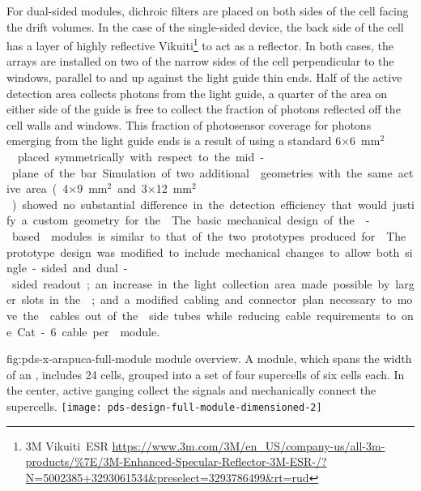 For dual-sided  modules, dichroic filters are placed on both sides of the cell facing the drift volumes.  In the case of the single-sided device, the back side of the cell has a layer of highly reflective Vikuiti\footnote{3M Vikuiti\texttrademark\  ESR \url{https://www.3m.com/3M/en_US/company-us/all-3m-products/\%7E/3M-Enhanced-Specular-Reflector-3M-ESR-/?N=5002385+3293061534&preselect=3293786499&rt=rud}
}
 to act as a  reflector.  In both cases, the  arrays are installed on two of the narrow sides of the cell perpendicular to the windows, parallel to and up against the light guide thin ends. Half of the  active detection area collects photons from the light guide, a quarter of the area on either side of the guide is free to collect the fraction of photons reflected off the cell walls and windows. 
This fraction of photosensor coverage for photons emerging from the light guide ends is a result of using a standard \num{6}$\times$\SI{6}{mm$^2$}  placed symmetrically with respect to the mid-plane of the bar. Simulation of two additional  geometries with the same active area (\num{4}$\times$\SI{9}{mm$^2$} and \num{3}$\times$\SI{12}{mm$^2$}) showed no substantial difference in the detection efficiency that would justify a custom geometry for the .

The basic mechanical design of the -based  modules is similar to that of the two prototypes produced for . 
The prototype design was modified to include mechanical changes to allow both single-sided and dual-sided readout; an increase in the light collection area made possible by larger slots in the ; and a modified cabling and connector plan necessary to move the  cables out of the  side tubes while reducing cable requirements to one Cat-6 cable per  module.

\begin{dunefigure}
{fig:pds-x-arapuca-full-module}
{ module overview. A module, which spans the width of an , includes 24
  cells, grouped into a set of four supercells of six cells each. In the center, active ganging  collect the signals and mechanically connect the supercells.}
   \texttt{[image: pds-design-full-module-dimensioned-2]}
\end{dunefigure}

